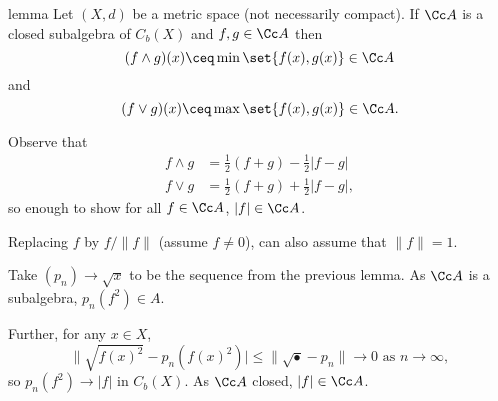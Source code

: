 \documentclass[class=article, crop=false]{standalone}
\begin{document}
\begin{result}{lemma}
  Let $(X,d)$ be a metric space (not necessarily compact). If $\Cc A$ is a closed subalgebra of $C_b(X)$ and $f,g \in \Cc A$ then
    \[
      (f \land g)(x) \ceq \min \set{f(x),g(x)} \in \Cc A
    \]
  and
    \[
      (f \lor g)(x) \ceq \max \set{f(x),g(x)} \in \Cc A.
    \]
\end{result}
\begin{pf}
  Observe that
    \begin{align*}
      f\land g &= \frac{1}{2}(f+g) - \frac{1}{2} |f-g|\\
      f \lor g &= \frac{1}{2}(f+g) + \frac{1}{2} |f-g|,
    \end{align*}
  so enough to show for all $f \in \Cc A$, $|f| \in \Cc A$.

  Replacing $f$ by $f/\|f\|$ (assume $f \neq 0$), can also assume that $\|f\|=1$.

  Take $(p_n) \to \sqrt x$ to be the sequence from the previous lemma. As $\Cc A$ is a subalgebra, $p_n(f^2) \in A$.

  Further, for any $x \in X$,
    \[
      \| \sqrt{f(x)^2} - p_n(f(x)^2)| \leq \|\sqrt{\bullet} - p_n\| \to 0 \text{ as } n \to \infty,
    \]
  so $p_n(f^2) \to |f|$ in $C_b(X)$. As $\Cc A$ closed, $|f| \in \Cc A$.

\end{pf}
\end{document}

